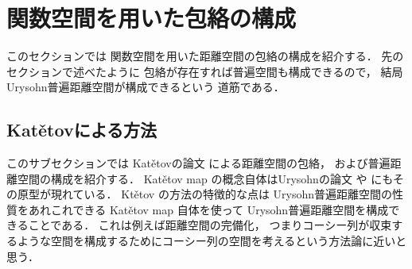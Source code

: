 \documentclass[leqno, 12pt]{jsarticle}
\begin{document}
\newpage
\section{関数空間を用いた包絡の構成}\label{sec:hourakuhouraku}
このセクションでは
関数空間を用いた距離空間の包絡の構成を紹介する．
先のセクションで述べたように
包絡が存在すれば普遍空間も構成できるので，
結局Urysohn普遍距離空間が構成できるという
道筋である．


\subsection{Kat\v{e}tovによる方法}

このサブセクションでは
Kat\v{e}tovの論文 
\cite{Ka}
による距離空間の包絡，
および普遍距離空間の構成を紹介する．
Kat\v{e}tov map
の概念自体はUrysohnの論文
 \cite{Ury1}
 や
  \cite{Ury2}
にもその原型が現れている．
Kt\v{e}tov
の方法の特徴的な点は
Urysohn普遍距離空間の性質をあれこれできる
Kat\v{e}tov map
自体を使って
Urysohn普遍距離空間を構成できることである．
これは例えば距離空間の完備化，
つまりコーシー列が収束するような空間を構成するためにコーシー列の空間を考えるという方法論に近いと思う．
\end{document}
